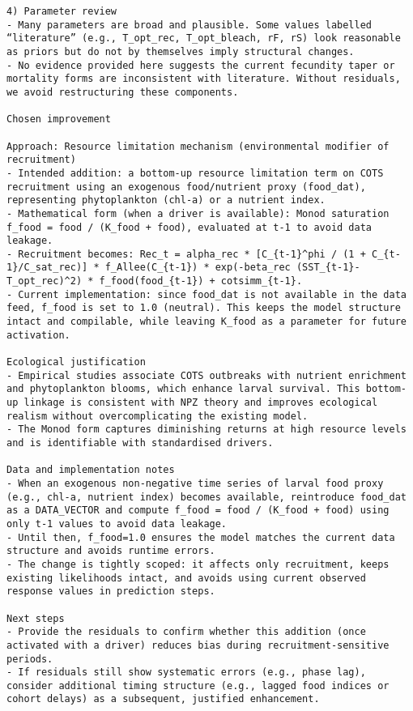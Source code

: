 \begin{lstlisting}
4) Parameter review
- Many parameters are broad and plausible. Some values labelled “literature” (e.g., T_opt_rec, T_opt_bleach, rF, rS) look reasonable as priors but do not by themselves imply structural changes.
- No evidence provided here suggests the current fecundity taper or mortality forms are inconsistent with literature. Without residuals, we avoid restructuring these components.

Chosen improvement

Approach: Resource limitation mechanism (environmental modifier of recruitment)
- Intended addition: a bottom-up resource limitation term on COTS recruitment using an exogenous food/nutrient proxy (food_dat), representing phytoplankton (chl-a) or a nutrient index.
- Mathematical form (when a driver is available): Monod saturation f_food = food / (K_food + food), evaluated at t-1 to avoid data leakage.
- Recruitment becomes: Rec_t = alpha_rec * [C_{t-1}^phi / (1 + C_{t-1}/C_sat_rec)] * f_Allee(C_{t-1}) * exp(-beta_rec (SST_{t-1}-T_opt_rec)^2) * f_food(food_{t-1}) + cotsimm_{t-1}.
- Current implementation: since food_dat is not available in the data feed, f_food is set to 1.0 (neutral). This keeps the model structure intact and compilable, while leaving K_food as a parameter for future activation.

Ecological justification
- Empirical studies associate COTS outbreaks with nutrient enrichment and phytoplankton blooms, which enhance larval survival. This bottom-up linkage is consistent with NPZ theory and improves ecological realism without overcomplicating the existing model.
- The Monod form captures diminishing returns at high resource levels and is identifiable with standardised drivers.

Data and implementation notes
- When an exogenous non-negative time series of larval food proxy (e.g., chl-a, nutrient index) becomes available, reintroduce food_dat as a DATA_VECTOR and compute f_food = food / (K_food + food) using only t-1 values to avoid data leakage.
- Until then, f_food=1.0 ensures the model matches the current data structure and avoids runtime errors.
- The change is tightly scoped: it affects only recruitment, keeps existing likelihoods intact, and avoids using current observed response values in prediction steps.

Next steps
- Provide the residuals to confirm whether this addition (once activated with a driver) reduces bias during recruitment-sensitive periods.
- If residuals still show systematic errors (e.g., phase lag), consider additional timing structure (e.g., lagged food indices or cohort delays) as a subsequent, justified enhancement.
\end{lstlisting}

